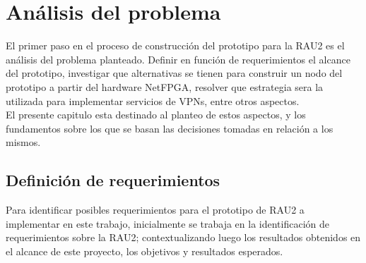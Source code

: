 \chapter{An\'alisis del problema}

\ifpdf
    \graphicspath{{Chapter3/Figs/Raster/}{Chapter3/Figs/PDF/}{Chapter3/Figs/}}
\else
    \graphicspath{{Chapter3/Figs/Vector/}{Chapter3/Figs/}}
\fi

El primer paso en el proceso de construcción del prototipo para la RAU2 es el análisis del problema planteado. Definir en función de requerimientos el alcance del prototipo, investigar que alternativas se tienen para construir un nodo del prototipo a partir del hardware NetFPGA, resolver que estrategia sera la utilizada para implementar servicios de VPNs, entre otros aspectos.\\

El presente capitulo esta destinado al planteo de estos aspectos, y los fundamentos sobre los que se basan las decisiones tomadas en relación a los mismos. 




\section[Definición de requerimientos]{Definición de requerimientos}
\label{3.1}

Para identificar posibles requerimientos para el prototipo de RAU2 a implementar en este trabajo, inicialmente se trabaja en la identificación de requerimientos sobre la RAU2; contextualizando luego los resultados obtenidos en el alcance de este proyecto, los objetivos y resultados esperados.\\

